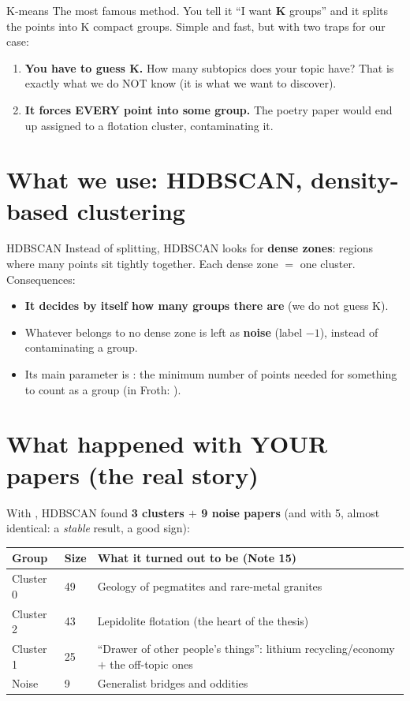 \documentclass[11pt,a4paper]{article}
\begin{document}
\begin{concepto}{K-means}
The most famous method. You tell it ``I want \textbf{K} groups'' and it splits the points into
K compact groups. Simple and fast, but with two traps for our case:
\begin{enumerate}
  \item \textbf{You have to guess K.} How many subtopics does your topic have? That is exactly
        what we do NOT know (it is what we want to discover).
  \item \textbf{It forces EVERY point into some group.} The poetry paper would end up assigned
        to a flotation cluster, contaminating it.
\end{enumerate}
\end{concepto}

\section{What we use: HDBSCAN, density-based clustering}

\begin{concepto}{HDBSCAN}
Instead of splitting, HDBSCAN looks for \textbf{dense zones}: regions where many points sit
tightly together. Each dense zone $=$ one cluster. Consequences:
\begin{itemize}
  \item \textbf{It decides by itself how many groups there are} (we do not guess K).
  \item Whatever belongs to no dense zone is left as \textbf{noise} (label $-1$), instead of
        contaminating a group.
  \item Its main parameter is : the minimum number of points needed
        for something to count as a group (in Froth: ).
\end{itemize}
\end{concepto}

\section{What happened with YOUR papers (the real story)}

With , HDBSCAN found \textbf{3 clusters $+$ 9 noise papers}
(and with 5, almost identical: a \emph{stable} result, a good sign):

\begin{center}
\begin{tabular}{llp{6.6cm}}
\textbf{Group} & \textbf{Size} & \textbf{What it turned out to be (Note 15)} \\
\hline
Cluster 0 & 49 & Geology of pegmatites and rare-metal granites \\
Cluster 2 & 43 & Lepidolite flotation (the heart of the thesis) \\
Cluster 1 & 25 & ``Drawer of other people's things'': lithium recycling/economy $+$ the off-topic ones \\
Noise & 9 & Generalist bridges and oddities \\
\end{tabular}
\end{center}
\end{document}
